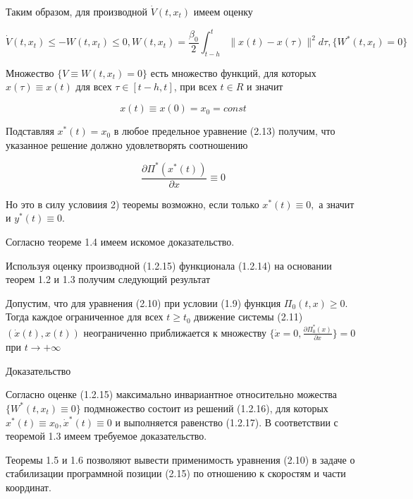 \begin{theorem}
Таким образом, для производной $\dot V(t, x_t)$ имеем оценку

\begin{equation}
\dot V(t, x_t) \le - W(t, x_t) \le 0, W(t, x_t) = \frac{\beta_0}{2} \int_{t - h}^{t} \| x(t) - x(\tau) \| ^ 2 d \tau, \lbrace W^{*} (t, x_t) = 0 \rbrace
\end{equation}

Множество $ \lbrace V \equiv {W(t, x_t) = 0} \rbrace$ есть множество функций, для которых $x(\tau) \equiv x(t)$ для всех $\tau \in [t - h, t]$, при всех $t \in R$ и значит 

\begin{equation}
x(t) \equiv x(0) = x_0 = const
\end{equation}

Подставляя $x^{*}(t) = x_0$ в любое предельное уравнение (2.13) получим, что указанное решение должно удовлетворять соотношению 

\begin{equation}
\frac{\partial \Pi^{*} (x^{*} (t))}{\partial x} \equiv 0
\end{equation}

Но это в силу условиия 2) теоремы возможно, если только $x^{*} (t) \equiv 0,$ а значит и $y^{*}(t) \equiv 0.$

Согласно теореме 1.4 имеем искомое доказательство.

Используя оценку производной (1.2.15) функционала (1.2.14) на основании теорем 1.2 и 1.3 получим следующий результат

\begin{theorem}\label{t-1.8}
Допустим, что для уравнения (2.10) при условии (1.9) функция $\Pi_0 (t, x) \ge 0$. Тогда каждое ограниченное для всех $t \ge t_0$ движение системы (2.11) $(\dot x(t), x(t))$ неограниченно приближается к множеству $ \lbrace \dot x = 0, \frac{\partial \Pi_0^{*} (x)}{\partial x} \rbrace = 0$ при $t \to + \infty$
\end{theorem}

Доказательство

Согласно оценке (1.2.15) максимально инвариантное относительно можества $\lbrace W^{*}(t, x_t) \equiv 0 \rbrace$ подмножество состоит из решений (1.2.16), для которых $x^{*} (t) \equiv x_0, \dot x^{*}(t) \equiv 0$ и выполняется равенство (1.2.17). В соответствии с теоремой 1.3 имеем требуемое доказательство.

Теоремы 1.5 и 1.6 позволяют вывести применимость уравнения (2.10) в задаче о стабилизации программной позиции (2.15) по отношению к скоростям и части координат. 


\end{theorem}
